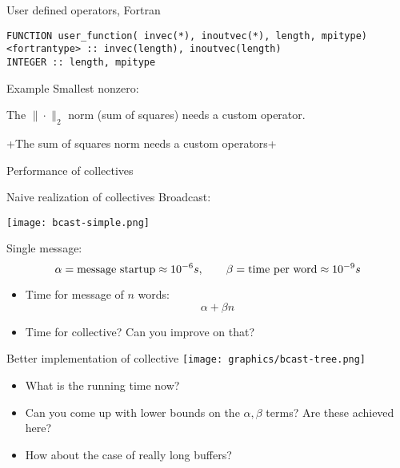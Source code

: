 \begin{fortran}
  \addtocounter{slidecount}{-1}
\begin{numberedframe}{User defined operators, Fortran}
\lstset{language=Fortran}
\begin{lstlisting}
FUNCTION user_function( invec(*), inoutvec(*), length, mpitype)
<fortrantype> :: invec(length), inoutvec(length) 
INTEGER :: length, mpitype
\end{lstlisting}
\end{numberedframe}
\end{fortran}


\begin{numberedframe}{Example}
  Smallest nonzero:
  
\end{numberedframe}

\begin{reviewframe}
  The $\|\cdot\|_2$ norm (sum of squares) needs a custom operator.
  
  \slackpollTF+The sum of squares norm needs a custom operators+
\end{reviewframe}

 {Performance of collectives}

\begin{numberedframe}{Naive realization of collectives}
  Broadcast:
  
  \texttt{[image: bcast-simple.png]}

  Single message:
  \[ \alpha=\hbox{message startup}\approx 10^{-6}s,\qquad
  \beta=\hbox{time per word}\approx 10^{-9}s
  \]
  \begin{itemize}
  \item Time for message of $n$ words: \[ \alpha +\beta n \]
  \item Time for collective? Can you improve on that?
  \end{itemize}

\end{numberedframe}

\begin{numberedframe}{Better implementation of collective}
  \texttt{[image: graphics/bcast-tree.png]}
  
  \begin{itemize}
  \item
    What is the running time now?
  \item
    Can you come up with lower bounds on the $\alpha,\beta$ terms? Are
    these achieved here?
  \item How about the case of really long buffers?
  \end{itemize}

\end{numberedframe}

